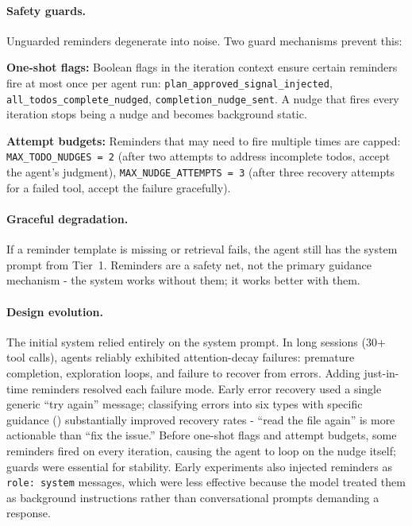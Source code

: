 \paragraph{Safety guards.} Unguarded reminders degenerate into noise. Two guard mechanisms prevent this:

\begin{packeditemize}
\item \textbf{One-shot flags:} Boolean flags in the iteration context ensure certain reminders fire at most once per agent run: \texttt{plan\_approved\_signal\_injected}, \texttt{all\_todos\_complete\_nudged}, \texttt{completion\_nudge\_sent}. A nudge that fires every iteration stops being a nudge and becomes background static.

\item \textbf{Attempt budgets:} Reminders that may need to fire multiple times are capped: \texttt{MAX\_TODO\_NUDGES~=~2} (after two attempts to address incomplete todos, accept the agent's judgment), \texttt{MAX\_NUDGE\_ATTEMPTS~=~3} (after three recovery attempts for a failed tool, accept the failure gracefully).
\end{packeditemize}

\paragraph{Graceful degradation.} If a reminder template is missing or retrieval fails, the agent still has the system prompt from Tier~1. Reminders are a safety net, not the primary guidance mechanism - the system works without them; it works better with them.

\paragraph{Design evolution.} The initial system relied entirely on the system prompt. In long sessions (30+ tool calls), agents reliably exhibited attention-decay failures: premature completion, exploration loops, and failure to recover from errors. Adding just-in-time reminders resolved each failure mode. Early error recovery used a single generic ``try again'' message; classifying errors into six types with specific guidance () substantially improved recovery rates - ``read the file again'' is more actionable than ``fix the issue.'' Before one-shot flags and attempt budgets, some reminders fired on every iteration, causing the agent to loop on the nudge itself; guards were essential for stability. Early experiments also injected reminders as \texttt{role:~system} messages, which were less effective because the model treated them as background instructions rather than conversational prompts demanding a response.

